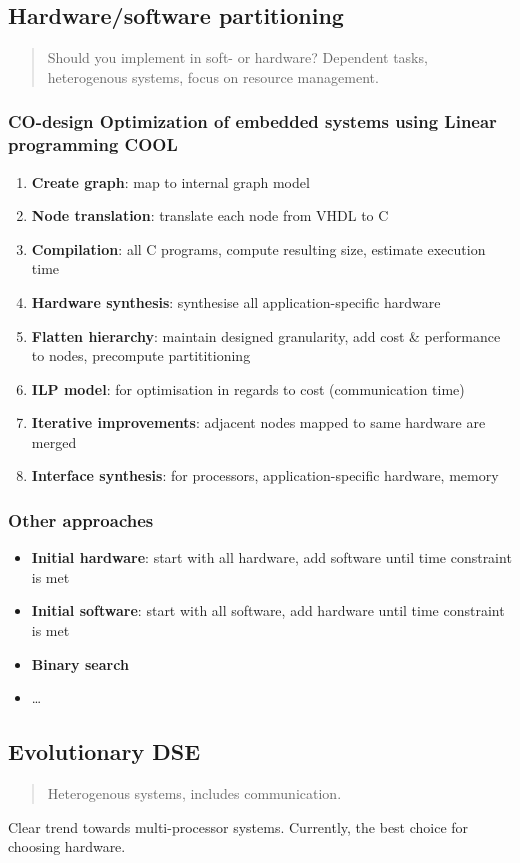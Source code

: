 \documentclass{article}
\begin{document}
\subsection{Hardware/software partitioning}
\begin{quote}Should you implement in soft- or hardware? Dependent tasks, heterogenous systems, focus on resource management.\end{quote}

\subsubsection{CO-design Optimization of embedded systems using Linear programming COOL}
\begin{enumerate}
  \item \textbf{Create graph}: map to internal graph model
  \item \textbf{Node translation}: translate each node from VHDL to C
  \item \textbf{Compilation}: all C programs, compute resulting size, estimate execution time
  \item \textbf{Hardware synthesis}: synthesise all application-specific hardware
  \item \textbf{Flatten hierarchy}: maintain designed granularity, add cost \& performance to nodes, precompute partititioning
  \item \textbf{ILP model}: for optimisation in regards to cost (communication time)
  \item \textbf{Iterative improvements}: adjacent nodes mapped to same hardware are merged
  \item \textbf{Interface synthesis}: for processors, application-specific hardware, memory
\end{enumerate}

\subsubsection{Other approaches}
\begin{itemize}
  \item \textbf{Initial hardware}: start with all hardware, add software until time constraint is met
  \item \textbf{Initial software}: start with all software, add hardware until time constraint is met
  \item \textbf{Binary search}
  \item …
\end{itemize}


\subsection{Evolutionary DSE}
\begin{quote}Heterogenous systems, includes communication.\end{quote}

Clear trend towards multi-processor systems. Currently, the best choice for choosing hardware.
\end{document}
